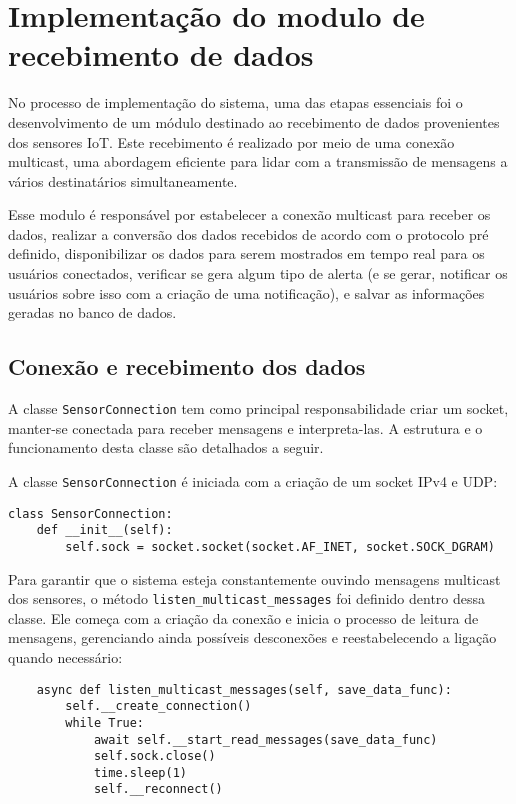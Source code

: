 \section{Implementação do modulo de recebimento de dados}\label{sec:Implementação do modulo de recebimento de dados}

No processo de implementação do sistema, uma das etapas essenciais foi o desenvolvimento de um módulo destinado ao recebimento de dados provenientes dos sensores IoT. Este recebimento é realizado por meio de uma conexão multicast, uma abordagem eficiente para lidar com a transmissão de mensagens a vários destinatários simultaneamente.

Esse modulo é responsável por estabelecer a conexão multicast para receber os dados, realizar a conversão dos dados recebidos de acordo com o protocolo pré definido, disponibilizar os dados para serem mostrados em tempo real para os usuários conectados, verificar se gera algum tipo de alerta (e se gerar, notificar os usuários sobre isso com a criação de uma notificação), e salvar as informações geradas no banco de dados.

\subsection[Conexão e recebimento dos dados]{Conexão e recebimento dos dados}\label{subsec:Conexão e recebimento dos dados}

A classe \texttt{SensorConnection} tem como principal responsabilidade criar um socket, manter-se conectada para receber mensagens e interpreta-las. A estrutura e o funcionamento desta classe são detalhados a seguir.

A classe \texttt{SensorConnection} é iniciada com a criação de um socket IPv4 e UDP:

\begin{verbatim}
class SensorConnection:
    def __init__(self):
        self.sock = socket.socket(socket.AF_INET, socket.SOCK_DGRAM)
\end{verbatim}

Para garantir que o sistema esteja constantemente ouvindo mensagens multicast dos sensores, o método \texttt{listen\_multicast\_messages} foi definido dentro dessa classe. Ele começa com a criação da conexão e inicia o processo de leitura de mensagens, gerenciando ainda possíveis desconexões e reestabelecendo a ligação quando necessário:

\begin{verbatim}
    async def listen_multicast_messages(self, save_data_func):
        self.__create_connection()
        while True:
            await self.__start_read_messages(save_data_func)
            self.sock.close()
            time.sleep(1)
            self.__reconnect()
\end{verbatim}

